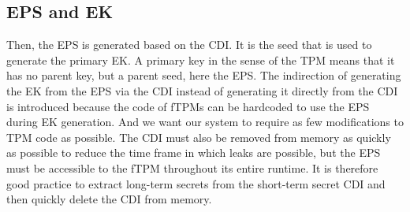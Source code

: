 


\subsection{EPS and EK}


Then, the \ac{EPS} is generated based on the \ac{CDI}\@.
It is the seed that is used to generate the primary \ac{EK}.
A primary key in the sense of the TPM means that it has no parent key, but a parent seed, here the \ac{EPS}\@.
The indirection of generating the \ac{EK} from the \ac{EPS} via the \ac{CDI} instead of generating it directly from the \ac{CDI} is introduced because the code of fTPMs can be hardcoded to use the \ac{EPS} during \ac{EK} generation.
And we want our system to require as few modifications to TPM code as possible.
The \ac{CDI} must also be removed from memory as quickly as possible to reduce the time frame in which leaks are possible, but the \ac{EPS} must be accessible to the \ac{fTPM} throughout its entire runtime.
It is therefore good practice to extract long-term secrets from the short-term secret \ac{CDI} and then quickly delete the \ac{CDI} from memory.


